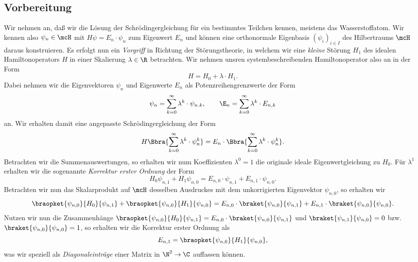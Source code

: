 \documentclass{subfiles}
\begin{document}
    \subsection{Vorbereitung}
        Wir nehmen an, daß wir die Lösung der Schrödingergleichung für ein bestimmtes Teilchen kennen, meistens das Wasserstoffatom. Wir kennen also $\psi_n\in\mcH$ mit $H\psi = E_n\cdot\psi_n$ zum Eigenwert $E_n$ und können eine orthonormale Eigenbasis $(\psi_i)_{i\in I}$ des Hilbertraums $\mcH$ daraus konstruieren. Es erfolgt nun ein \emph{Vorgriff} in Richtung der Störungstheorie, in welchem wir eine \emph{kleine} Störung $H_1$ des idealen Hamiltonoperators $H$ in einer Skalierung $\lambda\in\R$ betrachten. Wir nehmen unsren systembeschreibenden Hamiltonoperator also an in der Form
        \[
            H = H_0 + \lambda\cdot H_1.
        \]
        Dabei nehmen wir die Eigenvektoren $\psi_n$ und Eigenwerte $E_n$ als Potenzreihengrenzwerte der Form
        \[
            \psi_n = \sum_{k = 0}^\infty \lambda^k\cdot\psi_{n.k},\qquad \E_n = \sum_{k = 0}^\infty \lambda^k\cdot E_{n,k}
        \] 
        an. Wir erhalten damit eine angepasste Schrödingergleichung der Form
        \[
            H\Bbra{\sum_{k = 0}^\infty \lambda^k\cdot\psi_n^k} = E_n\cdot\Bbra{\sum_{k = 0}^\infty\lambda^k\cdot\psi_n^k}.
        \]
        Betrachten wir die Summenauswertungen, so erhalten wir num Koeffizienten $\lambda^0 = 1$ die originale ideale Eigenwertgleichung zu $H_0$. Für $\lambda^1$ erhalten wir die sogenannte \emph{Korrektur erster Ordnung} der Form
        \[
            H_0\psi_{n,1} + H_1\psi_{n,0} = E_{n,0}\cdot\psi_{n,1} + E_{n,1}\cdot\psi_{n,0}.
        \]
        Betrachten wir nun das Skalarprodukt auf $\mcH$ desselben Ausdruckes mit dem unkorrigierten Eigenvektor $\psi_{n,0}$, so erhalten wir
        \[
            \braopket{\psi_{n,0}}{H_0}{\psi_{n,1}} + \braopket{\psi_{n,0}}{H_1}{\psi_{n,0}} = E_{n,0}\cdot\braket{\psi_{n,0}}{\psi_{n,1}} + E_{n,1}\cdot\braket{\psi_{n,0}}{\psi_{n,0}}.
        \]
        Nutzen wir nun die Zusammenhänge $\braopket{\psi_{n,0}}{H_0}{\psi_{n,1}} = E_{n,0}\cdot\braket{\psi_{n,0}}{\psi_{n,1}}$ und $\braket{\psi_{n,1}}{\psi_{n,0}} = 0$ bzw. $\braket{\psi_{n,0}}{\psi_{n,0}} = 1$, so erhalten wir die Korrektur erster Ordnung als
        \[
            E_{n,1} = \braopket{\psi_{n,0}}{H_1}{\psi_{n,0}},
        \]
        was wir speziell als \emph{Diagonaleinträge} einer Matrix in $\N^2\to\C$ auffassen können. 
\end{document}
